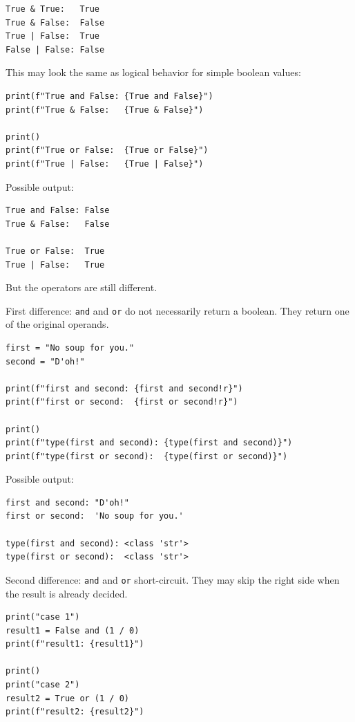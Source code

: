 \begin{verbatim}
True & True:   True
True & False:  False
True | False:  True
False | False: False
\end{verbatim}

This may look the same as logical behavior for simple boolean values:

\begin{verbatim}
print(f"True and False: {True and False}")
print(f"True & False:   {True & False}")

print()
print(f"True or False:  {True or False}")
print(f"True | False:   {True | False}")
\end{verbatim}

Possible output:

\begin{verbatim}
True and False: False
True & False:   False

True or False:  True
True | False:   True
\end{verbatim}

But the operators are still different.

First difference: \texttt{and} and \texttt{or} do not necessarily return a boolean. They return one of the original operands.

\begin{verbatim}
first = "No soup for you."
second = "D'oh!"

print(f"first and second: {first and second!r}")
print(f"first or second:  {first or second!r}")

print()
print(f"type(first and second): {type(first and second)}")
print(f"type(first or second):  {type(first or second)}")
\end{verbatim}

Possible output:

\begin{verbatim}
first and second: "D'oh!"
first or second:  'No soup for you.'

type(first and second): <class 'str'>
type(first or second):  <class 'str'>
\end{verbatim}

Second difference: \texttt{and} and \texttt{or} short-circuit. They may skip the right side when the result is already decided.

\begin{verbatim}
print("case 1")
result1 = False and (1 / 0)
print(f"result1: {result1}")

print()
print("case 2")
result2 = True or (1 / 0)
print(f"result2: {result2}")
\end{verbatim}

